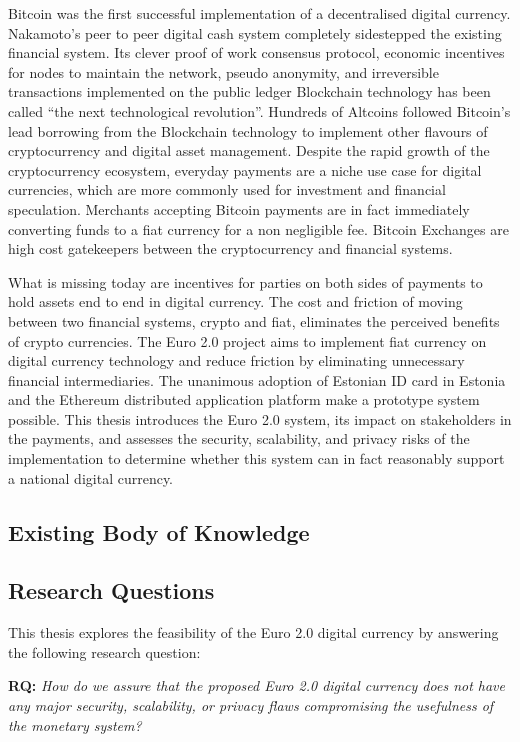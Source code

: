 \documentclass[12pt]{article} %
\begin{document}
Bitcoin was the first successful implementation of a decentralised digital currency. Nakamoto's peer to peer digital cash system completely sidestepped the existing financial system\cite{nakamoto2008bitcoin}. Its clever proof of work consensus protocol, economic incentives for nodes to maintain the network, pseudo anonymity, and irreversible transactions implemented on the public ledger Blockchain technology has been called ``the next technological revolution''. Hundreds of Altcoins followed Bitcoin's lead borrowing from the Blockchain technology to implement other flavours of cryptocurrency and digital asset management. Despite the rapid growth of the cryptocurrency ecosystem, everyday payments are a niche use case for digital currencies, which are more commonly used for investment and financial speculation\cite{Khairuddin:2016:EMB:2851581.2892500}. Merchants accepting Bitcoin payments are in fact immediately converting funds to a fiat currency for a non negligible fee. Bitcoin Exchanges are high cost gatekeepers between the cryptocurrency and financial systems.

What is missing today are incentives for parties on both sides of payments to hold assets end to end in digital currency. The cost and friction of moving between two financial systems, crypto and fiat, eliminates the perceived benefits of crypto currencies. The Euro 2.0 project aims to implement fiat currency on digital currency technology and reduce friction by eliminating unnecessary financial intermediaries. The unanimous adoption of Estonian ID card in Estonia and the Ethereum distributed application platform make a prototype system possible. This thesis introduces the Euro 2.0 system, its impact on stakeholders in the payments, and assesses the security, scalability, and privacy risks of the implementation to determine whether this system can in fact reasonably support a national digital currency.

\subsection{Existing Body of Knowledge} \label{ssec:1.1}


\subsection{Research Questions} \label{ssec:1.2}

This thesis explores the feasibility of the Euro 2.0 digital currency by answering the following research question:
\begin{quoting}
	\textbf{RQ: }\textit{How do we assure that the proposed Euro 2.0 digital currency does not have any major security, scalability, or privacy flaws compromising the usefulness of the monetary system?}
\end{quoting}
\end{document}

